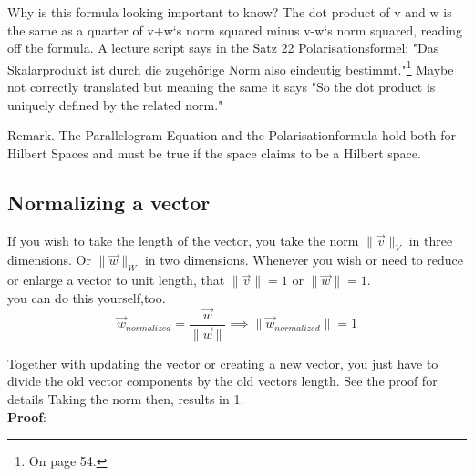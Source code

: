 \documentclass[a4paper]{article}
\begin{document}
Why is this formula looking important to know? The dot product of v and w is the same as a quarter of v+w`s norm squared minus v-w`s norm squared, reading off the formula. A lecture script \cite{FerusLA} says in the Satz 22 Polarisationsformel: "Das Skalarprodukt ist durch die zugeh\"orige Norm also eindeutig bestimmt."\footnote{On page 54.} Maybe not correctly translated but meaning the same it says "So the dot product is uniquely defined by the related norm."

Remark. The Parallelogram Equation and the Polarisationformula hold both for Hilbert Spaces and must be true if the space claims to be a Hilbert space.


\subsection{Normalizing a vector}
\label{normalizing_a_vector}

If you wish to take the length of the vector, you take the norm $\|\vec{v}\|_{V}$ in three dimensions. Or $\|\vec{w}\|_{W}$ in two dimensions. Whenever you wish or need to reduce or enlarge a vector to unit length, that $\|\vec{v}\|=1$ or $\|\vec{w}\|=1$.\\
you can do this yourself,too.                     \\

\begin{displaymath}
    \vec{w}_{normalized} = \frac{\vec{w}}{\|\vec{w}\|} \implies \|\vec{w}_{normalized}\| = 1
\end{displaymath}

Together with updating the vector or creating a new vector, you just have to divide the old vector components by the old vectors length. See the proof for details Taking the norm then, results in 1.\\                                                                     
\textbf{Proof}:
\end{document}
